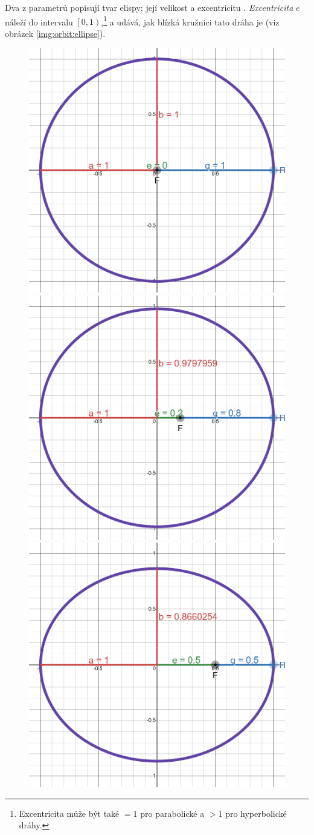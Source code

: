 \medskip

Dva z parametrů popisují tvar elispy; její velikost a excentricitu \cite{astro}. \textit{Excentricita} $e$ náleží do intervalu $\left[0,1\right)$,\footnote{Excentricita může být také $=1$ pro parabolické a $>1$ pro hyperbolické dráhy. } a udává, jak blízká kružnici tato dráha je (viz obrázek \ref{img:orbit:ellipse}).

\begin{figure}[ht]
    \centering
    \includegraphics[width=0.5\linewidth]{img/ellipse/ellipse-e00.png}\hfill
    \includegraphics[width=0.5\linewidth]{img/ellipse/ellipse-e02.png}\vfill
    \includegraphics[width=0.5\linewidth]{img/ellipse/ellipse-e05.png}\hfill

\end{figure}
